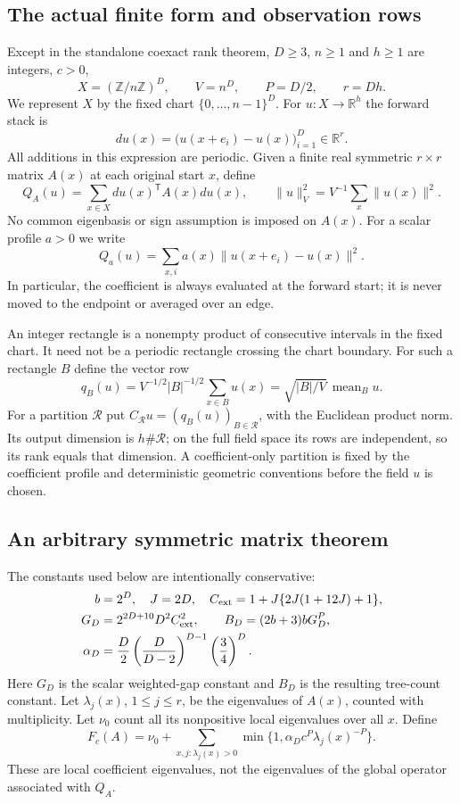 \documentclass[11pt]{article}
\newcommand{\R}{\mathbb R}
\newcommand{\Z}{\mathbb Z}
\newcommand{\mean}{\operatorname{mean}}
\newcommand{\normn}[1]{\|#1\|_{V}}
\begin{document}
\subsection{The actual finite form and observation rows}
Except in the standalone coexact rank theorem, $D\ge3$, $n\ge1$ and $h\ge1$ are integers, $c>0$,
\[
 X=(\Z/n\Z)^D,\qquad V=n^D,\qquad P=D/2,\qquad r=Dh.
\]
We represent $X$ by the fixed chart $\{0,\ldots,n-1\}^D$.
For $u:X\to\R^h$ the forward stack is
\[
 du(x)=\bigl(u(x+e_i)-u(x)\bigr)_{i=1}^D\in\R^r.
\]
All additions in this expression are periodic. Given a finite real symmetric
$r\times r$ matrix $A(x)$ at each original start $x$, define
\begin{equation}\label{eq:actual}
 Q_A(u)=\sum_{x\in X}du(x)^{\mathsf T}A(x)du(x),
 \qquad \normn{u}^2=V^{-1}\sum_x\|u(x)\|^2.
\end{equation}
No common eigenbasis or sign assumption is imposed on $A(x)$.
For a scalar profile $a>0$ we write
\[
 Q_a(u)=\sum_{x,i}a(x)\|u(x+e_i)-u(x)\|^2.
\]
In particular, the coefficient is always evaluated at the forward start;
it is never moved to the endpoint or averaged over an edge.

An integer rectangle is a nonempty product of consecutive intervals in the
fixed chart. It need not be a periodic rectangle crossing the chart boundary.
For such a rectangle $B$ define the vector row
\begin{equation}\label{eq:rows}
 q_B(u)=V^{-1/2}|B|^{-1/2}\sum_{x\in B}u(x)
       =\sqrt{|B|/V}\,\mean_B u.
\end{equation}
For a partition $\mathcal R$ put
$C_{\mathcal R}u=(q_B(u))_{B\in\mathcal R}$, with the Euclidean product norm.
Its output dimension is $h\#\mathcal R$; on the full field space its rows
are independent, so its rank equals that dimension. A coefficient-only
partition is fixed by the coefficient profile and deterministic geometric
conventions before the field $u$ is chosen.

\subsection{An arbitrary symmetric matrix theorem}
The constants used below are intentionally conservative:
\begin{align}\label{eq:constants}
 b&=2^D,\quad J=2D,\quad
 C_{\rm ext}=1+J\{2J(1+12J)+1\},\nonumber\\
 G_D&=2^{2D+10}D^2C_{\rm ext}^2,\qquad
 B_D=(2b+3)bG_D^P,\\
 \alpha_D&=\frac D2\left(\frac D{D-2}\right)^{D-1}
                      \left(\frac34\right)^D.\nonumber
\end{align}
Here $G_D$ is the scalar weighted-gap constant and $B_D$ is the resulting
tree-count constant. Let $\lambda_j(x)$, $1\le j\le r$, be the eigenvalues
of $A(x)$, counted with multiplicity. Let $\nu_0$ count all its nonpositive
local eigenvalues over all $x$. Define
\begin{equation}\label{eq:cap}
 F_c(A)=\nu_0+
 \sum_{x,j:\lambda_j(x)>0}
       \min\{1,\alpha_D c^P\lambda_j(x)^{-P}\}.
\end{equation}
These are local coefficient eigenvalues, not the eigenvalues of the global
operator associated with $Q_A$.
\end{document}
